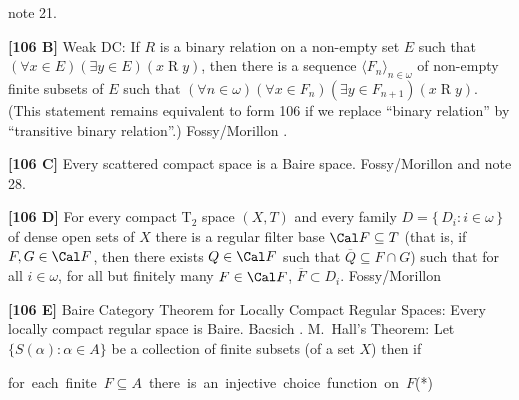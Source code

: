 note 21.
\smallskip
\item{}{\bf [106 B]} Weak DC: If $R$ is a binary relation on a non-empty
set $E$ such that $(\forall x\in E)(\exists y\in E)( x\mathrel R y)$,
then there is a sequence $\langle F_n\rangle_{n\in\omega}$ of
non-empty finite subsets of $E$ such that $(\forall n\in\omega)
(\forall x\in F_n)(\exists y\in F_{n+1}) (x\mathrel R y)$. (This
statement remains equivalent to form 106 if we replace ``binary relation''
by ``transitive binary relation''.)  \ac{Fossy/Morillon} \cite{1998}.
\smallskip
\item{}{\bf [106 C]}  Every scattered compact space is a Baire space.
\ac{Fossy/Morillon} \cite{1998} and note 28.
\smallskip
\item{}{\bf [106 D]} For every compact T$_2$ space $(X,T)$ and every
family $D=\{\, D_i : i\in\omega\,\}$ of dense open sets of $X$
there is a regular filter base $\Cal F \subseteq T$ (that is,
if $F,G\in \Cal F$, then there exists $Q\in \Cal F$ such that
$\overline{Q}\subseteq F\cap G$) such that for all $i\in\omega$,
for all but finitely many $F\in\Cal F$, $\overline{F}\subset D_i$.
\ac{Fossy/Morillon} \cite{1998}
\smallskip
\item{}{\bf [106 E]} Baire Category Theorem for Locally Compact
Regular Spaces: Every locally compact regular space is Baire.
\ac{Bacsich} \cite{1972b}.
\medskip
{}  M.~Hall's Theorem: Let $\{S(\alpha):
\alpha\in A\}$ be a collection of finite subsets (of a set $X$) then if

\hbox{for each finite $F \subseteq  A$
there is an injective choice function on $F$}\leqno(*)

